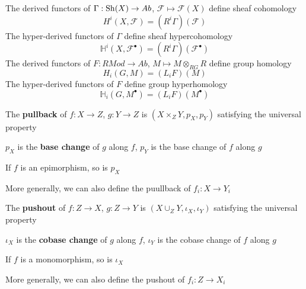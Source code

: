 \documentclass[main]{subfiles}
\begin{document}
\begin{example}
The derived functors of $\Gamma:\operatorname{Sh}(X)\to Ab$, $\mathcal F\mapsto \mathcal F(X)$ define sheaf cohomology
\[H^i(X,\mathcal F)=(R^i\Gamma)(\mathcal F)\]
The hyper-derived functors of $\Gamma$ define sheaf hypercohomology
\[\mathbb H^i(X,\mathcal F^\bullet)=(R^i\Gamma)(\mathcal F^\bullet)\]
The derived functors of $F:RMod\to Ab$, $M\mapsto M\otimes_{RG}R$ define group homology
\[H_i(G,M)=(L_iF)(M)\]
The hyper-derived functors of $F$ define group hyperhomology
\[\mathbb H_i(G,M^\bullet)=(L_iF)(M^\bullet)\]
\end{example}

\begin{definition}
The \textbf{pullback} of $f:X\to Z$, $g:Y\to Z$ is $(X\times_ZY,p_X,p_Y)$ satisfying the universal property
\begin{center}
\end{center}
$p_X$ is the \textbf{base change} of $g$ along $f$, $p_Y$ is the base change of $f$ along $g$ \par
If $f$ is an epimorphism, so is $p_X$ \par
More generally, we can also define the puullback of $f_i:X\to Y_i$
\end{definition}

\begin{definition}
The \textbf{pushout} of $f:Z\to X$, $g:Z\to Y$ is $(X\cup_ZY,\iota_X,\iota_Y)$ satisfying the universal property
\begin{center}
\end{center}
$\iota_X$ is the \textbf{cobase change} of $g$ along $f$, $\iota_Y$ is the cobase change of $f$ along $g$ \par
If $f$ is a monomorphism, so is $\iota_X$ \par
More generally, we can also define the pushout of $f_i:Z\to X_i$
\end{definition}
\end{document}
